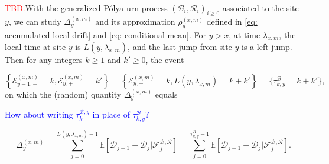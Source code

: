 \documentclass[twoside,12pt,a4paper]{article}
\numberwithin{equation}{section}
\newcommand\TBD{\textcolor{red}{TBD.}}
\newcommand{\comment}[1]{\textcolor{blue}{#1}}
\begin{document}
	\TBD With the generalized P\'{o}lya urn process $(\mathcal{B}_i,\mathcal{R}_i )_{i\ge 0}$ associated to the site $y$, we can study $\Delta_{y}^{(x,m)}$ and its approximation $\rho_{y}^{(x,m)}$ defined in \eqref{eq: accumulated local drift} and \eqref{eq: conditional mean}. For $y>x $, at time $\lambda_{x,m}$, the local time at site $y$ is $L(y,\lambda_{x,m})$, and the last jump from site $y$ is a left jump. Then for any integers $k\geq 1$ and $k' \geq 0$, the event 

		$$\left\{ \mathcal{E}^{(x,m)}_{y-1,+} =k, \mathcal{E}^{(x,m)}_{y,+} = k'\right\} = \left\{\mathcal{E}^{(x,m)}_{y,-} =k,  L(y,\lambda_{x,m}) = k+k' \right\} = \{ \tau^\mathcal{B}_{k,y} = k+k' \},$$ on which the (random) quantity $\Delta_{y}^{(x,m)}$ equals

		\comment{How about writing $\tau^{\mathcal{B}, y}_k$ in place of $\tau^{\mathcal{B}}_{k, y}$?}
		 
		\[
		\Delta_{y}^{(x,m)} =\sum_{j=0}^{ L(y,\lambda_{x,m})-1} \mathbb{E}\left[ \mathcal{D}_{j+1} -\mathcal{D}_{j}  \vert \mathcal{F}^{\mathcal{B},\mathcal{R}}_{j} \right] = \sum_{j=0}^{\tau^B_{k,y}-1} \mathbb{E}\left[ \mathcal{D}_{j+1} -\mathcal{D}_{j}  \vert \mathcal{F}^{\mathcal{B},\mathcal{R}}_{j} \right]
		.\] 
\end{document}
